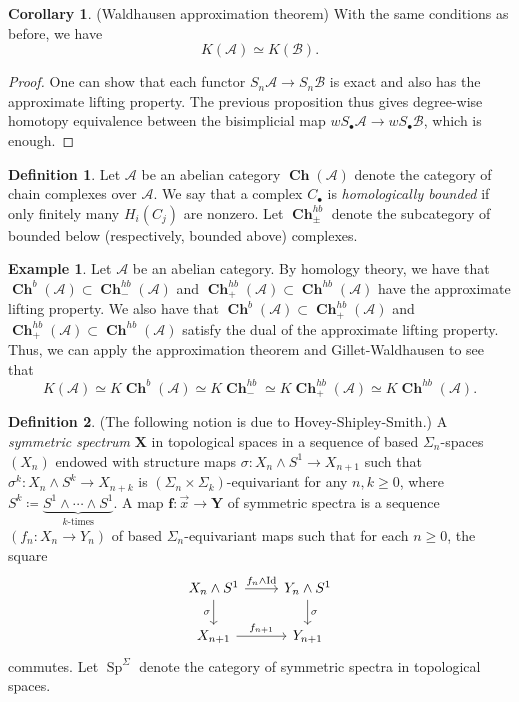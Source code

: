 \documentclass[10pt,letterpaper,cm]{nupset}
\theoremstyle{definition}
\newtheorem*{definition}{Definition}
\newtheorem{exmp}{Example}
\newtheorem{corollary}{Corollary}
\newcommand{\X}{\mathbf X}
\newcommand{\1}{\mathbf{1}}
\renewcommand{\a}{\mathscr{A}}
\renewcommand{\b}{\mathscr{B}}
\newcommand{\x}{\vec x}
\newcommand{\0}{\vec 0}
\DeclareMathOperator{\id}{Id}
\DeclareMathOperator{\Sp}{Sp}
\DeclareMathOperator{\ch}{\mathbf{Ch}}
\begin{document}
\begin{corollary}{(Waldhausen approximation theorem)}
With the same conditions as before, we have $$K(\a) \simeq K(\b).$$
\end{corollary}
\begin{proof}
One can show that each functor $S_n \a \to S_n \b$ is exact and also has the approximate lifting property.  The previous proposition thus gives degree-wise homotopy equivalence between the bisimplicial map $wS_{\bullet}\a \to wS_{\bullet} \b$, which is enough. 
\end{proof}

\begin{definition}
Let $\a$ be an abelian category $\ch(\a)$ denote the category of chain complexes over $\a$. We say that a complex $C_{\bullet}$ is \textit{homologically bounded} if only finitely many $H_i(C_j)$ are nonzero. Let $\ch_{\pm}^{hb}$ denote the subcategory of bounded below (respectively, bounded above) complexes. 
\end{definition}

\begin{exmp}
Let $\a$ be an abelian category. By homology theory, we have that $\ch^b(\a) \subset \ch_{-}^{hb}(\a)$ and $\ch_+^{hb}(\a)\subset \ch^{hb}(\a)$ have the approximate lifting property. We also have that $\ch^b(\a) \subset \ch_+^{hb}(\a)$ and $\ch_+^{hb}(\a)\subset \ch^{hb}(\a)$ satisfy the dual of the approximate lifting property. Thus, we can apply the approximation theorem and Gillet-Waldhausen to see that $$  K(\a) \simeq K\ch^b(\a) \simeq  K\ch_{-}^{hb}\simeq K\ch_{+}^{hb}(\a) \simeq K \ch^{hb}(\a).$$
\end{exmp}

\begin{definition}
(The following notion is due to Hovey-Shipley-Smith.) A \textit{symmetric spectrum} $\X$ in topological spaces in a sequence of based $\Sigma_n$-spaces $(X_n)$ endowed with structure maps $\sigma : X_n \land S^1 \to X_{n+1}$ such that $\sigma^k : X_n \land S^k \to X_{n+k}$ is $(\Sigma_{n}\times \Sigma_{k})$-equivariant for any $n,k\geq 0$, where $S^k \coloneqq \underbrace{S^1 \land \cdots \land S^1}_{k\text{-times}}$. A map $\mathbf{f} : \x \to \mathbf{Y}$ of symmetric spectra is a sequence $(f_n : X_n \to Y_n)$ of based $\Sigma_n$-equivariant maps such that for each $n\geq 0$, the square
\[
\begin{tikzcd}
X_n \land S^1 \arrow[d, "\sigma"'] \arrow[r, "f_n \land \id"] & Y_n \land S^1 \arrow[d, "\sigma"] \\
X_{n+1} \arrow[r, "f_{n+1}"] & Y_{n+1}
\end{tikzcd}
\]
commutes. Let $\Sp^{\Sigma}$ denote the category of symmetric spectra in topological spaces.
\end{definition}
\end{document}
